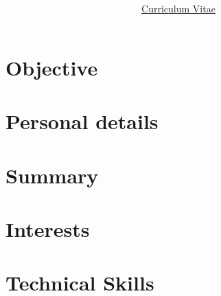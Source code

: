 \documentclass[10pt]{article}
\title{\Huge{\textbf{\myName}}}
\author{\Large{\underline{Curriculum Vitae}}}
\date{}
\begin{document}
\maketitle

\section*{Objective}


\section*{Personal details}
\begin{personalDetails}


\end{personalDetails}

\section*{Summary}


\section*{Interests}


\section*{Technical Skills}

\end{document}
